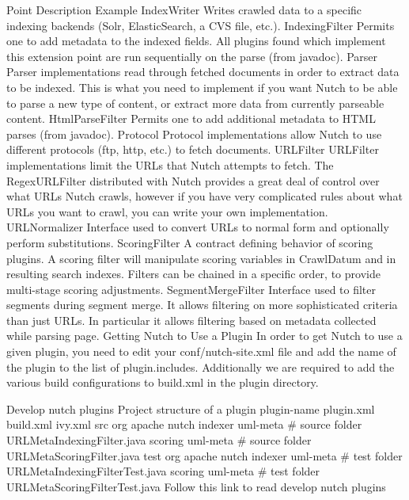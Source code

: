 {Point	Description	Example
IndexWriter	Writes crawled data to a specific indexing backends (Solr, ElasticSearch, a CVS file, etc.).
IndexingFilter	Permits one to add metadata to the indexed fields. All plugins found which implement this extension point are run sequentially on the parse (from javadoc).
Parser	Parser implementations read through fetched documents in order to extract data to be indexed. This is what you need to implement if you want Nutch to be able to parse a new type of content, or extract more data from currently parseable content.
HtmlParseFilter	Permits one to add additional metadata to HTML parses (from javadoc).
Protocol	Protocol implementations allow Nutch to use different protocols (ftp, http, etc.) to fetch documents.
URLFilter	URLFilter implementations limit the URLs that Nutch attempts to fetch. The RegexURLFilter distributed with Nutch provides a great deal of control over what URLs Nutch crawls, however if you have very complicated rules about what URLs you want to crawl, you can write your own implementation.
URLNormalizer	Interface used to convert URLs to normal form and optionally perform substitutions.
ScoringFilter	A contract defining behavior of scoring plugins. A scoring filter will manipulate scoring variables in CrawlDatum and in resulting search indexes. Filters can be chained in a specific order, to provide multi-stage scoring adjustments.
SegmentMergeFilter	Interface used to filter segments during segment merge. It allows filtering on more sophisticated criteria than just URLs. In particular it allows filtering based on metadata collected while parsing page.
Getting Nutch to Use a Plugin
In order to get Nutch to use a given plugin, you need to edit your conf/nutch-site.xml file and add the name of the plugin to the list of plugin.includes. Additionally we are required to add the various build configurations to build.xml in the plugin directory.

Develop nutch plugins
Project structure of a plugin
plugin-name
  plugin.xml
  build.xml
  ivy.xml
  src
    org
      apache
        nutch
          indexer
            uml-meta # source folder
              URLMetaIndexingFilter.java
          scoring
            uml-meta # source folder
              URLMetaScoringFilter.java
  test
    org
      apache
        nutch
          indexer
            uml-meta # test folder
              URLMetaIndexingFilterTest.java
          scoring
            uml-meta # test folder
              URLMetaScoringFilterTest.java
Follow this link to read develop nutch plugins

}
